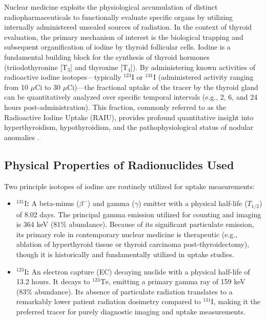 Nuclear medicine exploits the physiological accumulation of distinct radiopharmaceuticals to functionally evaluate specific organs by utilizing internally administered unsealed sources of radiation. In the context of thyroid evaluation, the primary mechanism of interest is the biological trapping and subsequent organification of iodine by thyroid follicular cells. Iodine is a fundamental building block for the synthesis of thyroid hormones (triiodothyronine [$\text{T}_3$] and thyroxine [$\text{T}_4$]). By administering known activities of radioactive iodine isotopes—typically $^{123}\text{I}$ or $^{131}\text{I}$ (administered activity ranging from 10 $\mu$Ci to 30 $\mu$Ci)—the fractional uptake of the tracer by the thyroid gland can be quantitatively analyzed over specific temporal intervals (e.g., 2, 6, and 24 hours post-administration). This fraction, commonly referred to as the Radioactive Iodine Uptake (RAIU), provides profound quantitative insight into hyperthyroidism, hypothyroidism, and the pathophysiological status of nodular anomalies \cite{cherry2012physics, captus4000e}.

\subsection{Physical Properties of Radionuclides Used}
Two principle isotopes of iodine are routinely utilized for uptake measurements:
\begin{itemize}
    \item \textbf{$^{131}\text{I}$:} A beta-minus ($\beta^-$) and gamma ($\gamma$) emitter with a physical half-life ($T_{1/2}$) of 8.02 days. The principal gamma emission utilized for counting and imaging is 364 keV (81\% abundance). Because of its significant particulate emission, its primary role in contemporary nuclear medicine is therapeutic (e.g., ablation of hyperthyroid tissue or thyroid carcinoma post-thyroidectomy), though it is historically and fundamentally utilized in uptake studies.
    \item \textbf{$^{123}\text{I}$:} An electron capture (EC) decaying nuclide with a physical half-life of 13.2 hours. It decays to $^{123}\text{Te}$, emitting a primary gamma ray of 159 keV (83\% abundance). Its absence of particulate radiation translates to a remarkably lower patient radiation dosimetry compared to $^{131}\text{I}$, making it the preferred tracer for purely diagnostic imaging and uptake measurements.
\end{itemize}

